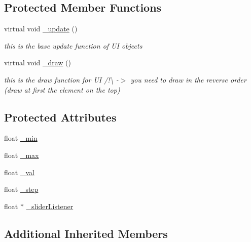 \subsection*{Protected Member Functions}
\begin{DoxyCompactItemize}
\item 
\mbox{\label{class_slider_u_i_a9655b73fc735ae70844e5fb3c7af24a5}} 
virtual void \hyperlink{class_slider_u_i_a9655b73fc735ae70844e5fb3c7af24a5}{\+\_\+update} ()
\begin{DoxyCompactList}\small\item\em this is the base update function of UI objects \end{DoxyCompactList}\item 
\mbox{\label{class_slider_u_i_a62219cde7516ea0e817b7371942ceff3}} 
virtual void \hyperlink{class_slider_u_i_a62219cde7516ea0e817b7371942ceff3}{\+\_\+draw} ()
\begin{DoxyCompactList}\small\item\em this is the draw function for UI /!\textbackslash{} -\/$>$ you need to draw in the reverse order (draw at first the element on the top) \end{DoxyCompactList}\end{DoxyCompactItemize}
\subsection*{Protected Attributes}
\begin{DoxyCompactItemize}
\item 
float \hyperlink{class_slider_u_i_aa27a55d587ee81a67bcfee2b1af6a191}{\+\_\+min}
\item 
float \hyperlink{class_slider_u_i_a85bda1931ca6f470109055be60cb1b65}{\+\_\+max}
\item 
float \hyperlink{class_slider_u_i_a63781e3bef83bf7582229ae881d68317}{\+\_\+val}
\item 
float \hyperlink{class_slider_u_i_ad69b467ac7d69fffaa53f188db2319f5}{\+\_\+step}
\item 
float $\ast$ \hyperlink{class_slider_u_i_a35404c20430dc397977de3ae0f8dba2a}{\+\_\+slider\+Listener}
\end{DoxyCompactItemize}
\subsection*{Additional Inherited Members}


